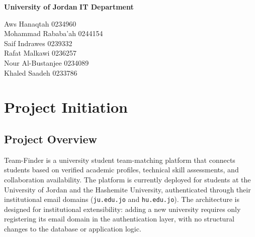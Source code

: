 \documentclass[12pt,a4paper]{article}
\begin{document}
\begin{titlepage}


  \vspace{10cm}

  \noindent\textbf{\large University of Jordan}
  \hfill
  \textbf{\large IT Department}

  \vspace{5.5cm}

  \noindent Aws Hanaqtah \hfill 0234960 \\[5pt]
  \noindent Mohammad Rababa'ah \hfill 0244154 \\[5pt]
  \noindent Saif Indrawes \hfill 0239332 \\[5pt]
  \noindent Rafat Malkawi \hfill 0236257 \\[5pt]
  \noindent Nour Al-Bustanjee \hfill 0234089 \\[5pt]
  \noindent Khaled Saadeh \hfill 0233786

\end{titlepage}

\newpage
\thispagestyle{plain}
\tableofcontents

\newpage
\section{Project Initiation}

\subsection{Project Overview}

Team-Finder is a university student team-matching platform that connects students based on
verified academic profiles, technical skill assessments, and collaboration availability.
The platform is currently deployed for students at the University of Jordan and the
Hashemite University, authenticated through their institutional email domains
(\texttt{ju.edu.jo} and \texttt{hu.edu.jo}). The architecture is designed for institutional
extensibility: adding a new university requires only registering its email domain in the
authentication layer, with no structural changes to the database or application logic.
\end{document}
